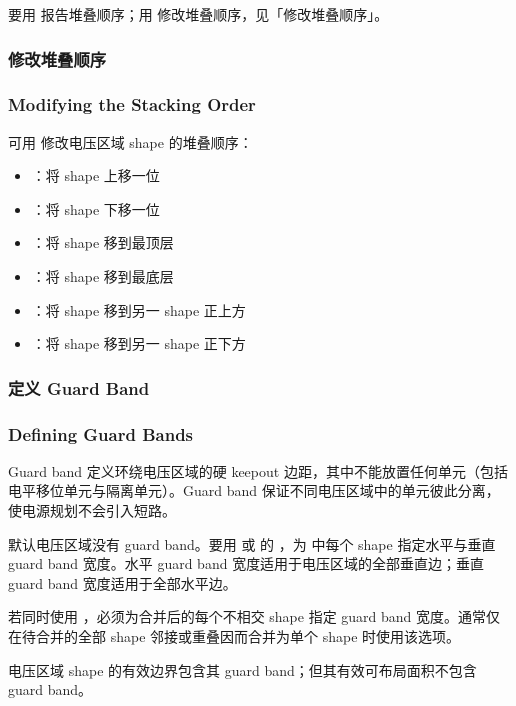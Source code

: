 要用  报告堆叠顺序；用  修改堆叠顺序，见「修改堆叠顺序」。

\subsubsection{修改堆叠顺序}
\subsubsection*{Modifying the Stacking Order}

可用  修改电压区域 shape 的堆叠顺序：
\begin{itemize}
  \item {}：将 shape 上移一位
  \item {}：将 shape 下移一位
  \item {}：将 shape 移到最顶层
  \item {}：将 shape 移到最底层
  \item {}：将 shape 移到另一 shape 正上方
  \item {}：将 shape 移到另一 shape 正下方
\end{itemize}

\subsubsection{定义 Guard Band}
\subsubsection*{Defining Guard Bands}

Guard band 定义环绕电压区域的硬 keepout 边距，其中不能放置任何单元（包括电平移位单元与隔离单元）。Guard band 保证不同电压区域中的单元彼此分离，使电源规划不会引入短路。

默认电压区域没有 guard band。要用  或  的 ，为  中每个 shape 指定水平与垂直 guard band 宽度。水平 guard band 宽度适用于电压区域的全部垂直边；垂直 guard band 宽度适用于全部水平边。

\begin{noteBox}
若同时使用 ，必须为合并后的每个不相交 shape 指定 guard band 宽度。通常仅在待合并的全部 shape 邻接或重叠因而合并为单个 shape 时使用该选项。
\end{noteBox}

电压区域 shape 的有效边界包含其 guard band；但其有效可布局面积不包含 guard band。

